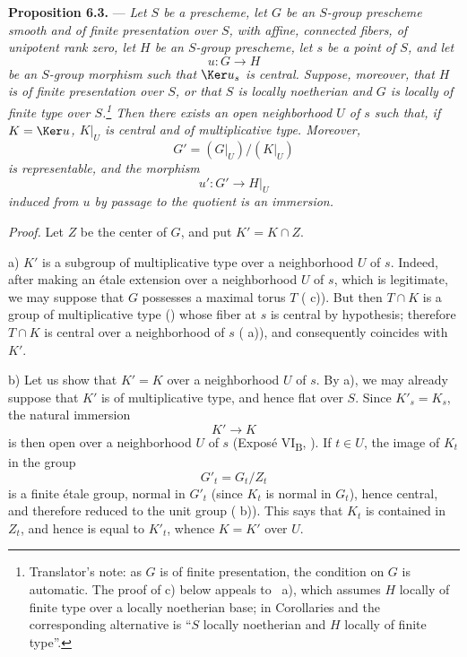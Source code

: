 \medskip
\noindent{}%
\textbf{Proposition 6.3.} --- \textit{Let \(S\) be a prescheme,
let \(G\) be an \(S\)-group prescheme smooth and of finite
presentation over \(S\), with affine, connected fibers, of
unipotent rank zero, let \(H\) be an \(S\)-group prescheme, let
\(s\) be a point of \(S\), and let}
\[
  u:G\longrightarrow H
\]
\textit{be an \(S\)-group morphism such that \(\Ker u_s\) is
central. Suppose, moreover, that \(H\) is of finite presentation
over \(S\), or that \(S\) is locally noetherian and \(G\) is
locally of finite type over \(S\).\footnote{Translator's note: as \(G\) is of finite presentation,
the condition on \(G\) is automatic. The proof of c) below appeals to
~a), which assumes \(H\) locally of finite type over a locally
noetherian base; in Corollaries  and
 the corresponding alternative is ``\(S\) locally noetherian
and \(H\) locally of finite type''.} Then there exists an open
neighborhood \(U\) of \(s\) such that, if \(K=\Ker u\), \(K|_U\)
is central and of multiplicative type. Moreover,}
\[
  G'=(G|_U)/(K|_U)
\]
\textit{is representable, and the morphism}
\[
  u':G'\longrightarrow H|_U
\]
\textit{induced from \(u\) by passage to the quotient is an
immersion.}

\medskip
\noindent\textit{Proof.}
Let \(Z\) be the center of \(G\), and put \(K'=K\cap Z\).

\medskip
\noindent a) \(K'\) is a subgroup of multiplicative type over a
neighborhood \(U\) of \(s\). Indeed, after making an étale
extension over a neighborhood \(U\) of \(s\), which is legitimate,
we may suppose that \(G\) possesses a maximal torus \(T\)
( c)). But then \(T\cap K\) is a group of multiplicative type
() whose fiber at \(s\) is central by hypothesis;
therefore \(T\cap K\) is central over a neighborhood of \(s\)
( a)), and consequently coincides with \(K'\).

\medskip
\noindent b) Let us show that \(K'=K\) over a neighborhood \(U\)
of \(s\). By a), we may already suppose that \(K'\) is of
multiplicative type, and hence flat over \(S\). Since \(K'_s=K_s\),
the natural immersion
\[
  K'\longrightarrow K
\]
is then open over a neighborhood \(U\) of \(s\) (Exposé
VI\textsubscript{B}, ). If \(t\in U\), the image of \(K_t\) in
the group
\[
  G'_t=G_t/Z_t
\]
is a finite étale group, normal in \(G'_t\) (since \(K_t\) is
normal in \(G_t\)), hence central, and therefore reduced to the
unit group ( b)). This says that \(K_t\) is contained in
\(Z_t\), and hence is equal to \(K'_t\), whence \(K=K'\) over
\(U\).

